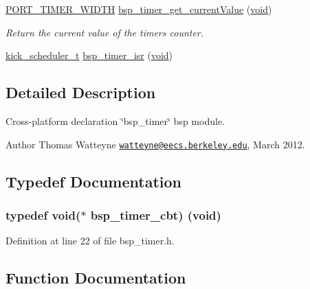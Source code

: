 \begin{DoxyCompactItemize}
\hyperlink{z1_2board__info_8h_abe66b9c1c60db84f2a99f2b827275f24}{P\+O\+R\+T\+\_\+\+T\+I\+M\+E\+R\+\_\+\+W\+I\+D\+TH} \hyperlink{group__bsp__timer_gae648940e8aa53efe781a7bbb056a9e50}{bsp\+\_\+timer\+\_\+get\+\_\+current\+Value} (\hyperlink{usb__devapi_8h_afabf60e7f57651d6d595a02c75f07cd0}{void})
\begin{DoxyCompactList}\small\item\em Return the current value of the timer\textquotesingle{}s counter. \end{DoxyCompactList}\item 
\hyperlink{group__board_gac9ebdcc0a4f3c8422f5f4f0fbbe0ded0}{kick\+\_\+scheduler\+\_\+t} \hyperlink{group__bsp__timer_ga1e6f08f2808b6c73ae3ee4d31346abb9}{bsp\+\_\+timer\+\_\+isr} (\hyperlink{usb__devapi_8h_afabf60e7f57651d6d595a02c75f07cd0}{void})
\end{DoxyCompactItemize}


\subsection{Detailed Description}
Cross-\/platform declaration \char`\"{}bsp\+\_\+timer\char`\"{} bsp module. 

\begin{DoxyAuthor}{Author}
Thomas Watteyne \href{mailto:watteyne@eecs.berkeley.edu}{\tt watteyne@eecs.\+berkeley.\+edu}, March 2012. 
\end{DoxyAuthor}


\subsection{Typedef Documentation}
\subsubsection[{\texorpdfstring{bsp\+\_\+timer\+\_\+cbt}{bsp_timer_cbt}}]{\setlength{\rightskip}{0pt plus 5cm}typedef {\bf void}($\ast$ bsp\+\_\+timer\+\_\+cbt) ({\bf void})}\hypertarget{group__bsp__timer_ga70c37f3709ac6eb30352181337000ba4}{}\label{group__bsp__timer_ga70c37f3709ac6eb30352181337000ba4}


Definition at line 22 of file bsp\+\_\+timer.\+h.



\subsection{Function Documentation}
